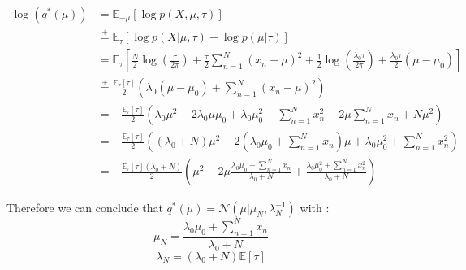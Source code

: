 \documentclass{article}
\begin{document}
\begin{equation}
    \begin{split}
        \log(q^*(\mu)) & = \mathbb{E}_{-\mu}[\log p(X, \mu, \tau)]                                                                                                                                                                                          \\
                       & \overset{+}{=} \mathbb{E}_\tau[\log p(X|\mu, \tau) + \log p(\mu|\tau)]                                                                                                                                                             \\
                       & = \mathbb{E}_\tau\left[\frac{N}{2}\log\left(\frac{\tau}{2\pi}\right) + \frac{\tau}{2}\sum_{n=1}^{N}(x_n - \mu)^2 + \frac{1}{2}\log\left(\frac{\lambda_0\tau}{2\pi}\right) + \frac{\lambda_0\tau}{2}\left(\mu - \mu_0\right)\right] \\
                       & \overset{+}{=} \frac{\mathbb{E}_{\tau}[\tau]}{2}\left(\lambda_0 (\mu - \mu_0) + \sum_{n=1}^{N}(x_n - \mu)^2\right)                                                                                                                 \\
                       & = - \frac{\mathbb{E}_\tau[\tau]}{2}\left(\lambda_0\mu^2 - 2\lambda_0\mu\mu_0 + \lambda_0\mu_0^2 + \sum_{n=1}^{N}x_n^2 - 2\mu\sum_{n=1}^{N}x_n + N\mu^2\right)                                                                      \\
                       & = - \frac{\mathbb{E}_\tau[\tau]}{2}\left((\lambda_0 + N)\mu^2 - 2(\lambda_0\mu_0 + \sum_{n=1}^{N}x_n)\mu + \lambda_0\mu_0^2 + \sum_{n=1}^{N}x_n^2\right)                                                                           \\
                       & = - \frac{\mathbb{E}_\tau[\tau](\lambda_0 + N)}{2}\left(\mu^2 - 2\mu\frac{\lambda_0\mu_0 + \sum_{n=1}^{N}x_n}{\lambda_0 + N} + \frac{\lambda_0\mu_0^2 + \sum_{n=1}^{N}x_n^2}{\lambda_0 + N}\right)
    \end{split}
\end{equation}

Therefore we can conclude that $q^*(\mu) = \mathcal{N}(\mu|\mu_N, \lambda_N^{-1})$ with :
\begin{equation}
    \mu_N     = \frac{\lambda_0\mu_0 + \sum_{n=1}^{N}x_n}{\lambda_0 + N}
\end{equation}
\begin{equation}
    \lambda_N = (\lambda_0 + N)\mathbb{E}[\tau]
\end{equation}
\end{document}
